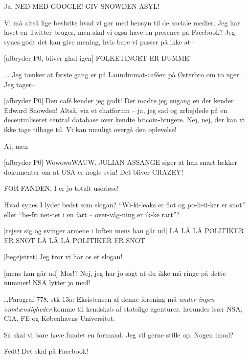 \documentclass[a4paper,11pt]{article}
\begin{document}
\begin{sketch}
 Ja, NED MED GOOGLE!  GIV SNOWDEN ASYL!

 Vi må altså lige beslutte hvad vi gør med hensyn til de sociale
medier.  Jeg har lavet en Twitter-bruger, men skal
vi også have en presence på Facebook?  Jeg synes godt det kan give mening, hvis
bare vi passer på ikke at--

[afbryder P0, bliver glad igen] FOLKETINGET ER DUMME!

 ... Jeg tænker at første gang er på Laundromat-caféen på Østerbro om
to uger.  Jeg tager--

[afbryder P0] Den café kender jeg godt! Der mødte jeg engang en der
kender Edward Snowden! Altså, via et chatforum -- ja, jeg sad og arbejdede på
en decentraliseret central database over kendte bitcoin-brugere.
 Nej, nej, der kan vi ikke tage tilbage til. Vi kan
umuligt overgå den oplevelse!

 Aj, men--

[afbryder P0] WowowoWAUW, JULIAN ASSANGE siger at han snart lækker
dokumenter om at USA er nogle svin!  Det bliver CRAZEY!

 FOR FANDEN, I er jo totalt useriøse!


 Hvad synes I lyder bedst som slogan?  ``Wi-ki-leaks er flot og
po-li-ti-ker er snot'' eller ``be-fri net-tet i en fart -- over-våg-ning er
ik-ke rart''?

[rejser sig og svinger armene i luften mens han går ud]
    LÅ LÅ LÅ POLITIKER ER SNOT
    LÅ LÅ LÅ POLITIKER ER SNOT

[begejstret] Jeg tror vi har os et slogan! 


[mens han går ud] Mor!? Nej, jeg har jo sagt at du ikke må ringe
på dette nummer! NSA lytter jo med!


 \ldots Paragraf 778, stk 13a: Eksistensen af denne forening må
\emph{under ingen omstændigheder} komme til kendskab af statslige agenturer,
herunder især NSA, CIA, FE og Københavns Universitet.


 Så skal vi bare have fundet en formand. Jeg vil gerne stille op.
Nogen imod?

 Fedt! Det skal på Facebook!



\end{sketch}
\end{document}
